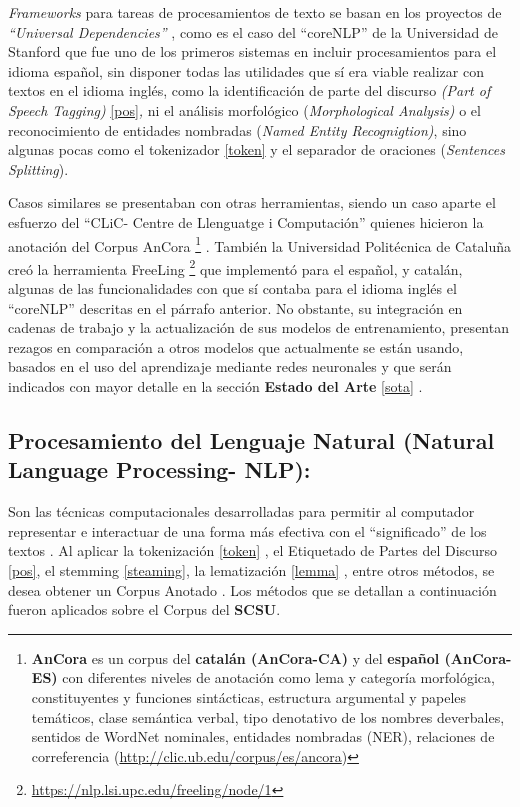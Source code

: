 \documentclass[
  10,
  openany]{book}
\begin{document}
\emph{Frameworks} para tareas de procesamientos de texto se basan en los proyectos de \emph{``Universal Dependencies''} \citep{demarneffe2021}, como es el caso del ``coreNLP'' de la Universidad de Stanford \citep{manning-etal-2014-stanford} que fue uno de los primeros sistemas en incluir procesamientos para el idioma español, sin disponer todas las utilidades que sí era viable realizar con textos en el idioma inglés, como la identificación de parte del discurso \emph{(Part of Speech Tagging)} \ref{pos}\emph{,} ni el análisis morfológico (\emph{Morphological Analysis)} \citep{straka2017} o el reconocimiento de entidades nombradas (\emph{Named Entity Recognigtion)}, sino algunas pocas como el tokenizador \ref{token} y el separador de oraciones (\emph{Sentences Splitting}).

Casos similares se presentaban con otras herramientas, siendo un caso aparte el esfuerzo del ``CLiC- Centre de Llenguatge i Computación'' quienes hicieron la anotación del Corpus AnCora \footnote{\textbf{AnCora} es un corpus del \textbf{catalán (AnCora-CA)} y del \textbf{español (AnCora-ES)} con diferentes niveles de anotación como lema y categoría morfológica, constituyentes y funciones sintácticas, estructura argumental y papeles temáticos, clase semántica verbal, tipo denotativo de los nombres deverbales, sentidos de WordNet nominales, entidades nombradas (NER), relaciones de correferencia (\url{http://clic.ub.edu/corpus/es/ancora})} . También la Universidad Politécnica de Cataluña creó la herramienta FreeLing \footnote{\url{https://nlp.lsi.upc.edu/freeling/node/1}} que implementó para el español, y catalán, algunas de las funcionalidades con que sí contaba para el idioma inglés el ``coreNLP'' descritas en el párrafo anterior. No obstante, su integración en cadenas de trabajo y la actualización de sus modelos de entrenamiento, presentan rezagos en comparación a otros modelos que actualmente se están usando, basados en el uso del aprendizaje mediante redes neuronales \citep{chen2014fast} y que serán indicados con mayor detalle en la sección \textbf{Estado del Arte} \ref{sota} .

\hypertarget{nlproc}{%
\subsection{Procesamiento del Lenguaje Natural (Natural Language Processing- NLP):}\label{nlproc}}

Son las técnicas computacionales desarrolladas para permitir al computador representar e interactuar de una forma más efectiva con el ``significado'' de los textos . Al aplicar la tokenización \ref{token} , el Etiquetado de Partes del Discurso \ref{pos}, el stemming \ref{steaming}, la lematización \ref{lemma} , entre otros métodos, se desea obtener un Corpus Anotado \citep{desagulier2017}. Los métodos que se detallan a continuación fueron aplicados sobre el Corpus del \textbf{SCSU}.
\end{document}
